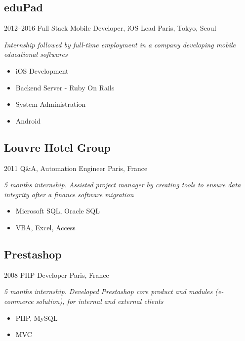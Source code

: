 \documentclass[]{template/friggeri-cv} %
\begin{document}


\subsection{eduPad}
\begin{entrylist}


\entry
{2012--2016}
{Full Stack Mobile Developer, iOS Lead}
{Paris, Tokyo, Seoul}
{\emph{Internship followed by full-time employment in a company developing mobile educational softwares}
\begin{itemize}
\item{iOS Development} 
\item{Backend Server - Ruby On Rails} 
\item{System Administration} 
\item{Android} 
\end{itemize}
}

\end{entrylist}



\subsection{Louvre Hotel Group}
\begin{entrylist}
\entry
{2011}
{Q\&A, Automation Engineer}
{Paris, France}
{\emph{5 months internship. Assisted project manager by creating tools to ensure data integrity after a finance software migration}\\

\begin{itemize}
\item {Microsoft SQL, Oracle SQL}
\item {VBA, Excel, Access}

\end{itemize}
}
\end{entrylist}

\goodbreak
\subsection{Prestashop}
\begin{entrylist}
\entry
{2008}
{PHP Developer}
{Paris, France}
{\emph{5 months internship. Developed Prestashop core product and modules (e-commerce solution), for internal and external clients}

\begin{itemize}

\item {PHP, MySQL}
\item {MVC}

\end{itemize}
}
\end{entrylist}
\end{document}
